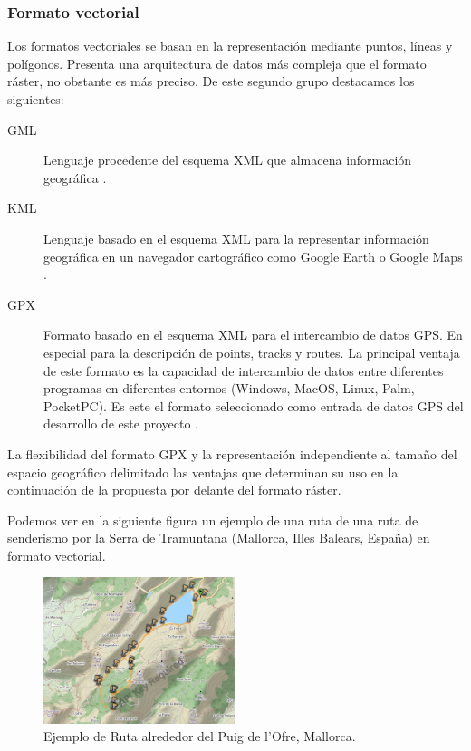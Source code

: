 \subsubsection{Formato vectorial}
Los formatos vectoriales se basan en la representación mediante puntos, líneas y polígonos. Presenta una
arquitectura de datos más compleja que el formato ráster, no obstante es más preciso.
De este segundo grupo destacamos los siguientes:
\begin{description}
\item [\ac{GML}] Lenguaje procedente del esquema \ac{XML} que almacena información geográfica 
\cite{OGC01}.
\item[\ac{KML}] Lenguaje basado en el esquema \ac{XML} para la representar información 
geográfica en un navegador cartográfico como Google Earth o Google Maps \cite{OGC02}.%
\item[\ac{GPX}]Formato basado en el esquema \ac{XML} para el intercambio de datos \ac{GPS}. 
En especial para la descripción de points, tracks y routes. La principal ventaja  de este formato 
es la capacidad de intercambio de datos entre diferentes  programas en diferentes entornos 
(Windows, MacOS, Linux, Palm, PocketPC). Es este el formato seleccionado como entrada de datos 
\ac{GPS} del desarrollo de este proyecto \cite{Topografix01}.
\end{description}
La flexibilidad del formato \ac{GPX} y la representación independiente al tamaño del espacio geográfico 
delimitado las ventajas que determinan su uso en la continuación de la propuesta por delante del formato 
ráster.

Podemos ver en la siguiente figura un ejemplo de  una ruta de una ruta de senderismo por la Serra de 
Tramuntana (Mallorca, Illes Balears, España) en formato vectorial.
\begin{figure}[!htb]
\begin{center}
\includegraphics[width=0.5\textwidth]{./Imagenes/RutaOfre.png}
\caption{Ejemplo de Ruta alrededor del Puig de l'Ofre, Mallorca.}
\label{figure:PointGeneration02}
\end{center}
\end{figure}
\newpage

